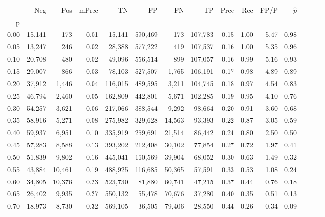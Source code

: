 \begin{tabular}{rrrrrrrrrrrrrrr}
\toprule
{} &     Neg &     Pos & mPrec &       TN &       FP &       FN &       TP &  Prec &   Rec &  FP/P & $\hat{p}$ \\
p    &         &         &       &          &          &          &          &       &       &       &           \\
\midrule
0.00 &  15,141 &     173 &  0.01 &   15,141 &  590,469 &      173 &  107,783 &  0.15 &  1.00 &  5.47 &      0.98 \\
0.05 &  13,247 &     246 &  0.02 &   28,388 &  577,222 &      419 &  107,537 &  0.16 &  1.00 &  5.35 &      0.96 \\
0.10 &  20,708 &     480 &  0.02 &   49,096 &  556,514 &      899 &  107,057 &  0.16 &  0.99 &  5.16 &      0.93 \\
0.15 &  29,007 &     866 &  0.03 &   78,103 &  527,507 &    1,765 &  106,191 &  0.17 &  0.98 &  4.89 &      0.89 \\
0.20 &  37,912 &   1,446 &  0.04 &  116,015 &  489,595 &    3,211 &  104,745 &  0.18 &  0.97 &  4.54 &      0.83 \\
0.25 &  46,794 &   2,460 &  0.05 &  162,809 &  442,801 &    5,671 &  102,285 &  0.19 &  0.95 &  4.10 &      0.76 \\
0.30 &  54,257 &   3,621 &  0.06 &  217,066 &  388,544 &    9,292 &   98,664 &  0.20 &  0.91 &  3.60 &      0.68 \\
0.35 &  58,916 &   5,271 &  0.08 &  275,982 &  329,628 &   14,563 &   93,393 &  0.22 &  0.87 &  3.05 &      0.59 \\
0.40 &  59,937 &   6,951 &  0.10 &  335,919 &  269,691 &   21,514 &   86,442 &  0.24 &  0.80 &  2.50 &      0.50 \\
0.45 &  57,283 &   8,588 &  0.13 &  393,202 &  212,408 &   30,102 &   77,854 &  0.27 &  0.72 &  1.97 &      0.41 \\
0.50 &  51,839 &   9,802 &  0.16 &  445,041 &  160,569 &   39,904 &   68,052 &  0.30 &  0.63 &  1.49 &      0.32 \\
0.55 &  43,884 &  10,461 &  0.19 &  488,925 &  116,685 &   50,365 &   57,591 &  0.33 &  0.53 &  1.08 &      0.24 \\
0.60 &  34,805 &  10,376 &  0.23 &  523,730 &   81,880 &   60,741 &   47,215 &  0.37 &  0.44 &  0.76 &      0.18 \\
0.65 &  26,402 &   9,935 &  0.27 &  550,132 &   55,478 &   70,676 &   37,280 &  0.40 &  0.35 &  0.51 &      0.13 \\
0.70 &  18,973 &   8,730 &  0.32 &  569,105 &   36,505 &   79,406 &   28,550 &  0.44 &  0.26 &  0.34 &      0.09 \\

\end{tabular}
